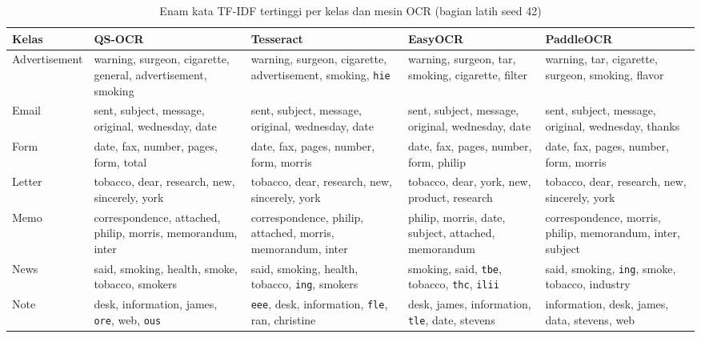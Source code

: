 \begin{table}[H]
  \centering
  \caption{Enam kata TF-IDF tertinggi per kelas dan mesin OCR (bagian latih seed 42)}
  \label{tab:eda-tfidf}
  \fontsize{8}{9.5}\selectfont
  \setlength{\tabcolsep}{3pt}
  \begin{tabularx}{\textwidth}{|l|>{\raggedright\arraybackslash}X|>{\raggedright\arraybackslash}X|>{\raggedright\arraybackslash}X|>{\raggedright\arraybackslash}X|}
    \hline
    \textbf{Kelas} & \textbf{QS-OCR} & \textbf{Tesseract} & \textbf{EasyOCR} & \textbf{PaddleOCR} \\ \hline
    Advertisement & warning, surgeon, cigarette, general, advertisement, smoking &
    warning, surgeon, cigarette, advertisement, smoking, \texttt{hie} &
    warning, surgeon, tar, smoking, cigarette, filter &
    warning, tar, cigarette, surgeon, smoking, flavor \\ \hline
    Email & sent, subject, message, original, wednesday, date &
    sent, subject, message, original, wednesday, date &
    sent, subject, message, original, wednesday, date &
    sent, subject, message, original, wednesday, thanks \\ \hline
    Form & date, fax, number, pages, form, total &
    date, fax, pages, number, form, morris &
    date, fax, pages, number, form, philip &
    date, fax, pages, number, form, morris \\ \hline
    Letter & tobacco, dear, research, new, sincerely, york &
    tobacco, dear, research, new, sincerely, york &
    tobacco, dear, york, new, product, research &
    tobacco, dear, research, new, sincerely, york \\ \hline
    Memo & correspondence, attached, philip, morris, memorandum, inter &
    correspondence, philip, attached, morris, memorandum, inter &
    philip, morris, date, subject, attached, memorandum &
    correspondence, morris, philip, memorandum, inter, subject \\ \hline
    News & said, smoking, health, smoke, tobacco, smokers &
    said, smoking, health, tobacco, \texttt{ing}, smokers &
    smoking, said, \texttt{tbe}, tobacco, \texttt{thc}, \texttt{ilii} &
    said, smoking, \texttt{ing}, smoke, tobacco, industry \\ \hline
    Note & desk, information, james, \texttt{ore}, web, \texttt{ous} &
    \texttt{eee}, desk, information, \texttt{fle}, ran, christine &
    desk, james, information, \texttt{tle}, date, stevens &
    information, desk, james, data, stevens, web \\ \hline

\end{tabularx}
\end{table}
